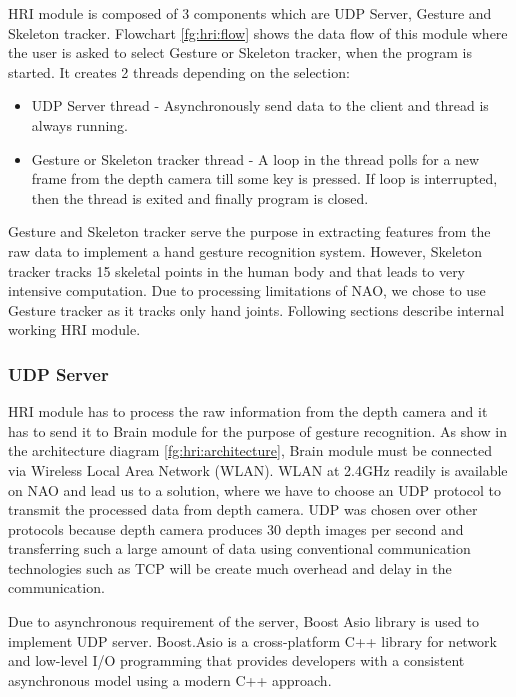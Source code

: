 HRI module is composed of 3 components which are UDP Server, Gesture and Skeleton tracker. Flowchart \ref{fg:hri:flow} shows the data flow of this module where the user is asked to select Gesture or Skeleton tracker, when the program is started. It creates 2 threads depending on the selection: 

\begin{itemize}
	\item UDP Server thread - Asynchronously send data to the client and thread is always running.
	\item Gesture or Skeleton tracker thread - A loop in the thread polls for a new frame from the depth camera till some key is pressed. If loop is interrupted, then the thread is exited and finally program is closed.

\end{itemize}

Gesture and Skeleton tracker serve the purpose in extracting features from the raw data to implement a hand gesture recognition system. However, Skeleton tracker tracks 15 skeletal points in the human body and that leads to very intensive computation. Due to processing limitations of NAO, we chose to use Gesture tracker as it tracks only hand joints. Following sections describe internal working HRI module.



\subsubsection{UDP Server}
HRI module has to process the raw information from the depth camera and it has to send it to Brain module for the purpose of gesture recognition. As show in the architecture diagram \ref{fg:hri:architecture}, Brain module must be connected via Wireless Local Area Network (WLAN). WLAN at 2.4GHz readily is available on NAO and lead us to a solution, where we have to choose an UDP protocol to transmit the processed data from depth camera. UDP was chosen over other protocols because depth camera produces 30 depth images per second and transferring such a large amount of data using conventional communication technologies such as TCP will be create much overhead and delay in the communication.

Due to asynchronous requirement of the server, Boost Asio library is used to implement UDP server. Boost.Asio is a cross-platform C++ library for network and low-level I/O programming that provides developers with a consistent asynchronous model using a modern C++ approach.

